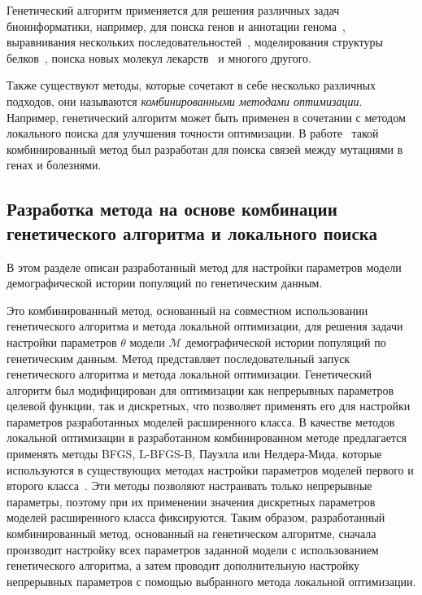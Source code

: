 Генетический алгоритм применяется для решения различных задач биоинформатики, например, для поиска генов и аннотации генома~\cite{chowdhury2017optimized}, выравнивания нескольких последовательностей~\cite{chowdhury2017review}, моделирования структуры белков~\cite{unger2004genetic}, поиска новых молекул лекарств~\cite{spiegel2020autogrow4} и многого другого. 

Также существуют методы, которые сочетают в себе несколько различных подходов, они называются \emph{комбинированными методами оптимизации}.
Например, генетический алгоритм может быть применен в сочетании с методом локального поиска для улучшения точности оптимизации.
В работе~\cite{yang2016genetic} такой комбинированный метод был разработан для поиска связей между мутациями в генах и болезнями.

\subsection{Разработка метода на основе комбинации генетического алгоритма и локального поиска}

В этом разделе описан разработанный метод для настройки параметров модели демографической истории популяций по генетическим данным.

Это комбинированный метод, основанный на совместном использовании генетического алгоритма и метода локальной оптимизации, для решения задачи настройки параметров $\theta$ модели $\mathcal{M}$ демографической истории популяций по генетическим данным.
Метод представляет последовательный запуск генетического алгоритма и метода локальной оптимизации. 
Генетический алгоритм был модифицирован для оптимизации как непрерывных параметров целевой функции, так и дискретных, что позволяет применять его для настройки параметров разработанных моделей расширенного класса.
В качестве методов локальной оптимизации в разработанном комбинированном методе предлагается применять методы BFGS, L-BFGS-B, Пауэлла или Нелдера-Мида, которые используются в существующих методах настройки параметров моделей первого и второго класса~\cite{gutenkunst2009inferring, }.
Эти методы позволяют настраивать только непрерывные параметры, поэтому при их применении значения дискретных параметров моделей расширенного класса фиксируются.
Таким образом, разработанный комбинированный метод, основанный на генетическом алгоритме, сначала производит настройку всех параметров заданной модели с использованием генетического алгоритма, а затем проводит дополнительную настройку непрерывных параметров с помощью выбранного метода локальной оптимизации.

